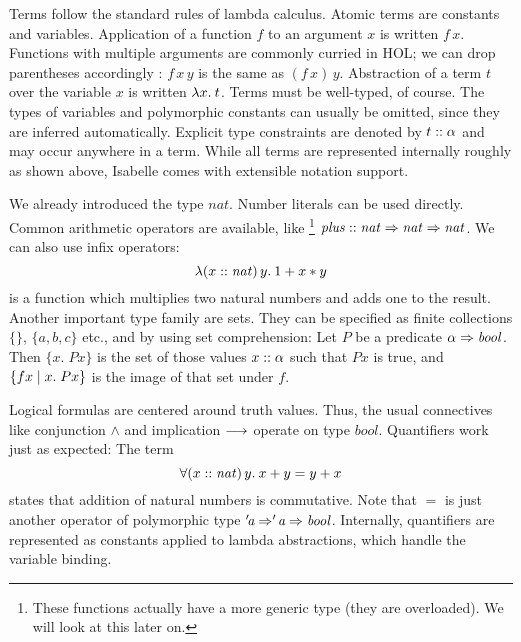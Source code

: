 Terms follow the standard rules of lambda calculus.
Atomic terms are constants and variables.
Application of a function $f$ to an argument $x$ is written $f\,x$.
Functions with multiple arguments are commonly curried in HOL;
we can drop parentheses accordingly : $f\,x\,y$ is the same as $(f\,x)\,y$.
Abstraction of a term $t$ over the variable $x$ is written $\lambda x.\>t$.
Terms must be well-typed, of course.
The types of variables and polymorphic constants can usually be omitted, since
they are inferred automatically.
Explicit type constraints are denoted by $t \mathrel{::} \alpha$ and may occur
anywhere in a term.
While all terms are represented internally roughly as shown above, Isabelle
comes with extensible notation support.

\begin{example}\label{exmp:hol-terms}
We already introduced the type $\mathit{nat}$.
Number literals can be used directly.
Common arithmetic operators are available, like%
\footnote{These functions actually have a more generic type (they are
overloaded). We will look at this later on.}
$\mathit{plus} \mathrel{::} \mathit{nat} \Rightarrow \mathit{nat} \Rightarrow \mathit{nat}$.
We can also use infix operators:
\[ \lambda (x \mathrel{::} \mathit{nat})\,y.\>1 + x * y \]
is a function which multiplies two natural numbers and adds one to the result.
Another important type family are sets.
They can be specified as finite collections $\{\}$, $\{a, b, c\}$ etc., and
by using set comprehension:
Let $P$ be a predicate $\alpha \Rightarrow \mathit{bool}$.
Then $\{x.\; P x\}$ is the set of those values $x \mathrel{::} \alpha$ such that
$P x$ is true, and $\{f x\mid x.\; P x\}$ is the image of that set under $f$.

Logical formulas are centered around truth values.
Thus, the usual connectives like conjunction $\land$ and implication $\longrightarrow$
operate on type $\mathit{bool}$.
Quantifiers work just as expected: The term
\[ \forall (x \mathrel{::} \mathit{nat})\,y.\>x + y = y + x \]
states that addition of natural numbers is commutative.
Note that $=$ is just another operator of polymorphic type
$'\!\textit{a} \Rightarrow '\!\textit{a} \Rightarrow \mathit{bool}$.
Internally, quantifiers are represented as constants applied to lambda
abstractions, which handle the variable binding.
\end{example}

